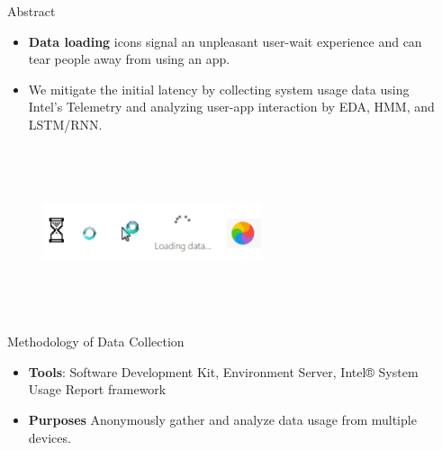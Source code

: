 \documentclass[final]{beamer}
\newlength{\sepwidth}
\newlength{\colwidth}
\newcommand{\separatorcolumn}{\begin{column}{\sepwidth}\end{column}}
\begin{document}
\begin{frame}[t]
  \begin{columns}[t]
    \separatorcolumn

    \begin{column}{\colwidth}

      \begin{block}{\huge{Abstract}}

        {
          \fontsize{37pt}{44.4pt} \selectfont 
          \begin{itemize}
            \item \textbf{Data loading} icons signal an unpleasant user-wait experience and can tear people away from using an app.
            \item We mitigate the initial latency by collecting system usage data using Intel’s Telemetry and analyzing user-app interaction by EDA, HMM, and LSTM/RNN.
        \end{itemize}
        }
        \begin{figure}\includegraphics[width=0.6\textwidth, height=5cm]{user-wait.jpeg}\end{figure}

      \end{block}

      \begin{alertblock}{\huge{Methodology of Data Collection}}

        {
          \fontsize{37pt}{44.4pt} \selectfont 
          \begin{itemize}
            \item \textbf{Tools}: Software Development Kit, Environment Server, Intel® System Usage Report framework
            \item \textbf{Purposes} Anonymously gather and analyze data usage from multiple devices. 
          \end{itemize}
        }
        

\end{alertblock}
\end{column}
\end{columns}
\end{frame}
\end{document}
